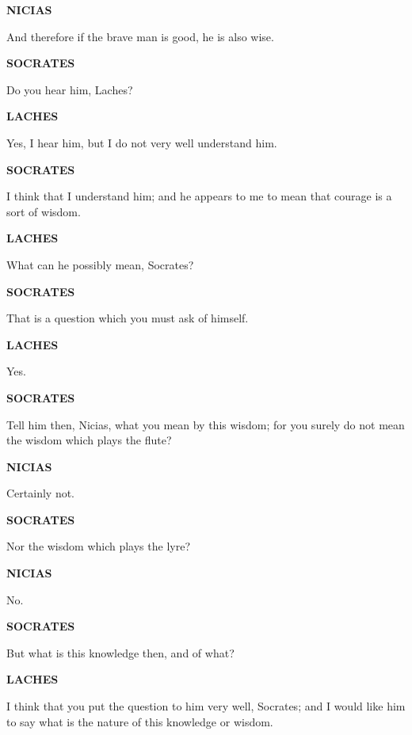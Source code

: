 \documentclass[11pt,letter]{article}
\begin{document}
\par \textbf{NICIAS}
\par   And therefore if the brave man is good, he is also wise.

\par \textbf{SOCRATES}
\par   Do you hear him, Laches?

\par \textbf{LACHES}
\par   Yes, I hear him, but I do not very well understand him.

\par \textbf{SOCRATES}
\par   I think that I understand him; and he appears to me to mean that courage is a sort of wisdom.

\par \textbf{LACHES}
\par   What can he possibly mean, Socrates?

\par \textbf{SOCRATES}
\par   That is a question which you must ask of himself.

\par \textbf{LACHES}
\par   Yes.

\par \textbf{SOCRATES}
\par   Tell him then, Nicias, what you mean by this wisdom; for you surely do not mean the wisdom which plays the flute?

\par \textbf{NICIAS}
\par   Certainly not.

\par \textbf{SOCRATES}
\par   Nor the wisdom which plays the lyre?

\par \textbf{NICIAS}
\par   No.

\par \textbf{SOCRATES}
\par   But what is this knowledge then, and of what?

\par \textbf{LACHES}
\par   I think that you put the question to him very well, Socrates; and I would like him to say what is the nature of this knowledge or wisdom.
\end{document}
